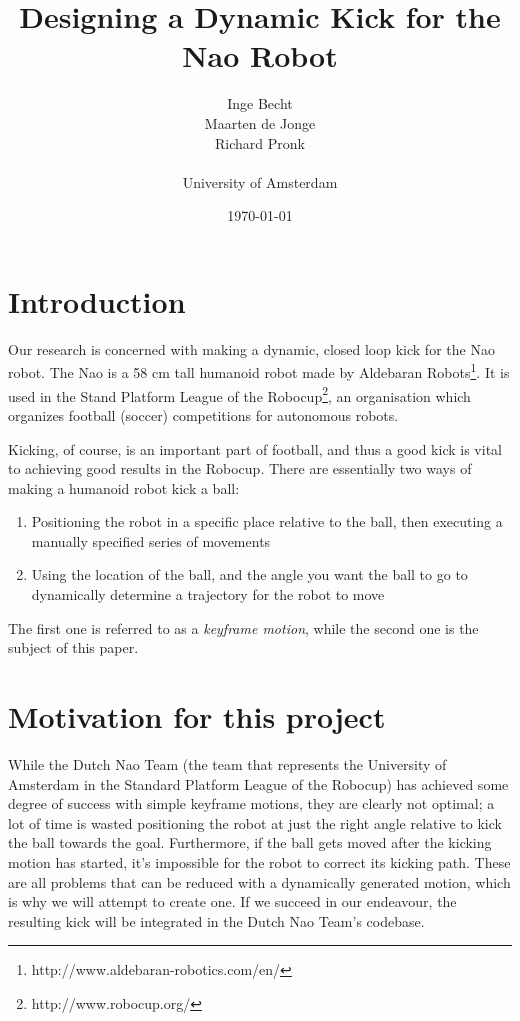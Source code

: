 \documentclass[a4paper]{article}
\begin{document}
\title{Designing a Dynamic Kick for the Nao Robot}
\author{ Inge Becht \\ 
         Maarten de Jonge \\ 
         Richard Pronk \\\\
         \large{University of Amsterdam}}
\date{\today}
\maketitle

\section{Introduction} 
Our research is concerned with making a dynamic, closed
loop kick for the Nao robot. The Nao is a 58 cm tall humanoid robot made by Aldebaran Robots\footnote{http://www.aldebaran-robotics.com/en/}. It is used in the Stand Platform League of the Robocup\footnote{http://www.robocup.org/}, an organisation which organizes football (soccer) competitions for autonomous robots.

Kicking, of course, is an important part of football, and thus a good kick is vital to achieving good results in the Robocup. There are essentially two ways of making a humanoid robot kick a ball:
\begin{enumerate}
  \item Positioning the robot in a specific place relative to the ball, then executing a manually specified series of movements
  \item Using the location of the ball, and the angle you want the ball to go to dynamically determine a trajectory for the robot to move
\end{enumerate}
The first one is referred to as a \emph{keyframe motion}, while the second one is the subject of this paper.

\section{Motivation for this project} 
While the Dutch Nao Team (the team that represents the University of Amsterdam in the Standard Platform League of the Robocup) has achieved some degree of success with simple keyframe motions, they are clearly not optimal; a lot of time is wasted positioning the robot at just the right angle relative to kick the ball towards the goal. Furthermore, if the ball gets moved after the kicking motion has started, it's impossible for the robot to correct its kicking path. These are all problems that can be reduced with a dynamically generated motion, which is why we will attempt to create one. If we succeed in our endeavour, the resulting kick will be integrated in the Dutch Nao Team's codebase.
\end{document}
